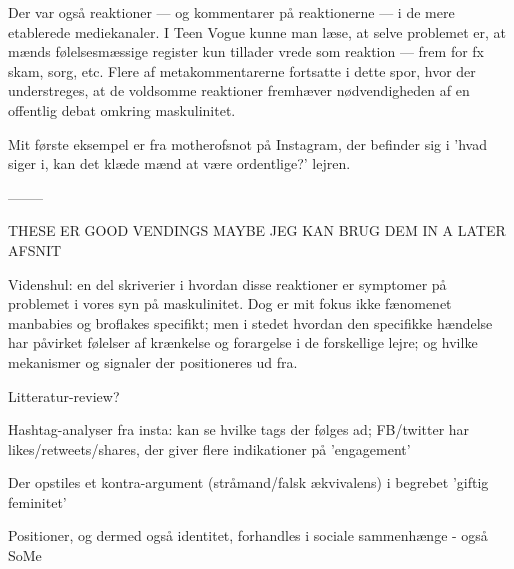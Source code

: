 Der var også reaktioner — og kommentarer på reaktionerne — i de
mere etablerede mediekanaler. I Teen Vogue kunne man læse, at
selve problemet er, at mænds følelsesmæssige register kun tillader
vrede som reaktion — frem for fx skam, sorg, etc. Flere af
metakommentarerne fortsatte i dette spor, hvor der understreges,
at de voldsomme reaktioner fremhæver nødvendigheden af en
offentlig debat omkring maskulinitet.  

Mit første eksempel er fra motherofsnot på Instagram, der befinder
sig i 'hvad siger i, kan det klæde mænd at være ordentlige?'
lejren.

—-----

THESE ER GOOD VENDINGS MAYBE JEG KAN BRUG DEM IN A LATER AFSNIT

Videnshul: en del skriverier i hvordan disse reaktioner er
symptomer på problemet i vores syn på maskulinitet. Dog er mit
fokus ikke fænomenet manbabies og broflakes specifikt; men i
stedet hvordan den specifikke hændelse har påvirket følelser af
krænkelse og forargelse i de forskellige lejre; og hvilke
mekanismer og signaler der positioneres ud fra.

Litteratur-review?

Hashtag-analyser fra insta: kan se hvilke tags der følges ad;
FB/twitter har likes/retweets/shares, der giver flere indikationer
på 'engagement'

Der opstiles et kontra-argument (stråmand/falsk ækvivalens) i
begrebet 'giftig feminitet'

Positioner, og dermed også identitet, forhandles i sociale
sammenhænge - også SoMe


